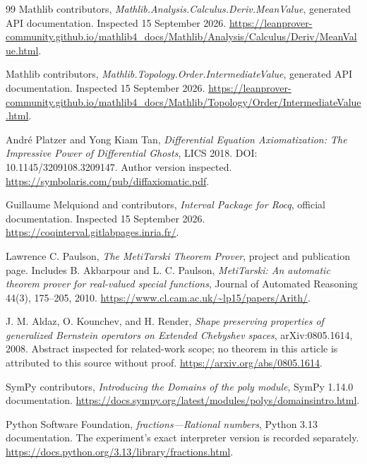 \begin{thebibliography}{99}
Mathlib contributors, \emph{Mathlib.Analysis.Calculus.Deriv.MeanValue}, generated API documentation. Inspected 15 September 2026.
\url{https://leanprover-community.github.io/mathlib4_docs/Mathlib/Analysis/Calculus/Deriv/MeanValue.html}.

Mathlib contributors, \emph{Mathlib.Topology.Order.IntermediateValue}, generated API documentation. Inspected 15 September 2026.
\url{https://leanprover-community.github.io/mathlib4_docs/Mathlib/Topology/Order/IntermediateValue.html}.

Andr\'e Platzer and Yong Kiam Tan, \emph{Differential Equation Axiomatization: The Impressive Power of Differential Ghosts}, LICS 2018. DOI: 10.1145/3209108.3209147. Author version inspected.
\url{https://symbolaris.com/pub/diffaxiomatic.pdf}.

Guillaume Melquiond and contributors, \emph{Interval Package for Rocq}, official documentation. Inspected 15 September 2026.
\url{https://coqinterval.gitlabpages.inria.fr/}.

Lawrence C. Paulson, \emph{The MetiTarski Theorem Prover}, project and publication page. Includes B. Akbarpour and L. C. Paulson, \emph{MetiTarski: An automatic theorem prover for real-valued special functions}, Journal of Automated Reasoning 44(3), 175--205, 2010.
\url{https://www.cl.cam.ac.uk/~lp15/papers/Arith/}.

J. M. Aldaz, O. Kounchev, and H. Render, \emph{Shape preserving properties of generalized Bernstein operators on Extended Chebyshev spaces}, arXiv:0805.1614, 2008. Abstract inspected for related-work scope; no theorem in this article is attributed to this source without proof.
\url{https://arxiv.org/abs/0805.1614}.

SymPy contributors, \emph{Introducing the Domains of the poly module}, SymPy 1.14.0 documentation.
\url{https://docs.sympy.org/latest/modules/polys/domainsintro.html}.

Python Software Foundation, \emph{fractions---Rational numbers}, Python 3.13 documentation. The experiment's exact interpreter version is recorded separately.
\url{https://docs.python.org/3.13/library/fractions.html}.
\end{thebibliography}
